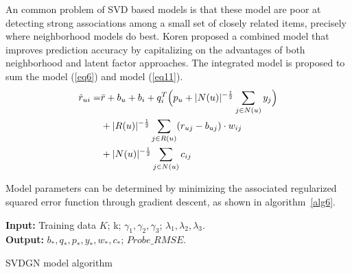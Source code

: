 \documentclass[journal]{IEEEtran}
\begin{document}
An common problem of SVD based models is that these model are poor at detecting strong associations among a small set of closely related items, precisely where neighborhood models do best.  Koren\cite{koren} proposed a combined model that improves prediction accuracy by capitalizing on the advantages of both neighborhood and latent factor approaches.  The integrated model is proposed to sum the model (\ref{eq6}) and model (\ref{eq11}).
\begin{align}
\label{eq9}
\hat{r}_{ui} = & \bar{r} + b_u + b_i  +  q_i^T\Big(p_u + |N(u)|^{-\frac{1}{2}} \sum_{j \in N(u)}  y_{j} \Big) \notag \\& 
+ |R(u)|^{-\frac{1}{2}} \sum_{j \in R(u)} (r_{uj} - b_{uj}) \cdot w_{ij}  \notag \\
& + |N(u)|^{-\frac{1}{2}} \sum_{j \in N(u)}  c_{ij}
\end{align}

Model parameters can be determined by minimizing the associated regularized squared error function through gradient descent, as shown in algorithm~\ref{alg6}.

\begin{algorithm}[ht]
 \SetAlgoLined  %
 \textbf{Input:} {Training data $K$; k; $\gamma_1, \gamma_2,\gamma_3$; $\lambda_1, \lambda_2, \lambda_3$.} \\
 \textbf{Output:} {$b_*, q_*, p_*, y_*, w_*, c_*$; $Probe\_RMSE$.} \\

 \caption{SVDGN model algorithm}
\label{alg6}
\end{algorithm}
\end{document}

